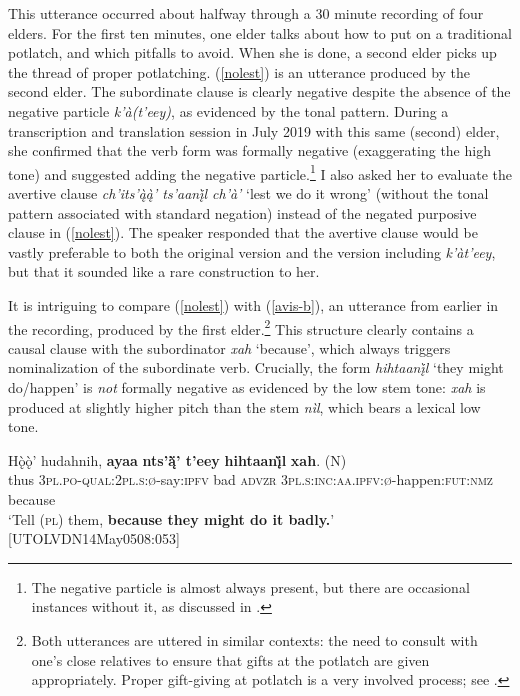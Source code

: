 \documentclass[output=paper,colorlinks,citecolor=brown
]{langscibook}
\begin{document}
\noindent This utterance occurred about halfway through a 30 minute recording of four elders. For the first ten minutes, one elder talks about how to put on a traditional potlatch, and which pitfalls to avoid. When she is done, a second elder picks up the thread of proper potlatching. (\ref{nolest}) is an utterance produced by the second elder. The subordinate clause is clearly negative despite the absence of the negative particle \textit{k'à(t'eey)}, as evidenced by the tonal pattern. During a transcription and translation session in July 2019 with this same (second) elder, she confirmed that the verb form was formally negative (exaggerating the high tone) and suggested adding the negative particle.\footnote{The negative particle is almost always present, but there are occasional instances without it, as discussed in \citet{LovickOinprep}.} I also asked her to evaluate the avertive clause \textit{ch'its'ą̀ą̀' ts'aanį̀l ch'à'} `lest we do it wrong' (without the tonal pattern associated with standard negation) instead of the negated purposive clause in (\ref{nolest}). The speaker responded that the avertive clause would be vastly preferable to both the original version and the version including \textit{k'àt'eey}, but that it sounded like a rare construction to her.

\largerpage
It is intriguing to compare (\ref{nolest}) with  (\ref{avis-b}), an utterance from earlier in the recording, produced by the first elder.\footnote{Both utterances are uttered in similar contexts: the need to consult with one's close relatives to ensure that gifts at the potlatch are given appropriately. Proper gift-giving at potlatch is a very involved process; see \citet{SimeoneW1995}.}  This structure clearly contains a causal clause with the subordinator \textit{xah} `because', which always triggers nominalization of the subordinate verb. Crucially, the form \textit{hihtaanį̀l} `they might do/happen' is \textit{not} formally negative as evidenced by the low stem tone: \textit{xah} is produced at slightly higher pitch than the stem \textit{nìl}, which bears a lexical low tone.

\ea
\label{avis-b}
\gll Hǫ̀ǫ̀' hudahnih, \textbf{ayaa} \textbf{nts'ą̈̀' t'eey} \textbf{hihtaanį̀l} {\textbf{xah}. \textnormal{(N)}} \\
thus \textsc{3pl.po-qual:2pl.s:ø}-say:\textsc{ipfv} bad \textsc{advzr} \textsc{3pl.s:inc:aa.ipfv:ø}-happen:\textsc{fut:nmz} because \\
\glt `Tell (\textsc{pl}) them, \textbf{because they might do it badly.}' \\ \hfill [UTOLVDN14May0508:053]
\z
\end{document}
